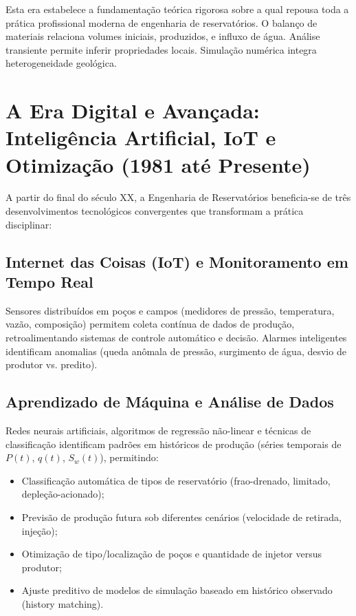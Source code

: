 \documentclass[12pt,a4paper,oneside,brazilian,sumario=tradicional]{abntex2}
\begin{document}
Esta era estabelece a fundamentação teórica rigorosa sobre a qual repousa toda a prática profissional moderna de engenharia de reservatórios. O balanço de materiais relaciona volumes iniciais, produzidos, e influxo de água. Análise transiente permite inferir propriedades locais. Simulação numérica integra heterogeneidade geológica.

\section{A Era Digital e Avançada: Inteligência Artificial, IoT e Otimização (1981 até Presente)}

A partir do final do século XX, a Engenharia de Reservatórios beneficia-se de três desenvolvimentos tecnológicos convergentes que transformam a prática disciplinar:

\subsection*{Internet das Coisas (IoT) e Monitoramento em Tempo Real}

Sensores distribuídos em poços e campos (medidores de pressão, temperatura, vazão, composição) permitem coleta contínua de dados de produção, retroalimentando sistemas de controle automático e decisão. Alarmes inteligentes identificam anomalias (queda anômala de pressão, surgimento de água, desvio de produtor vs. predito).

\subsection*{Aprendizado de Máquina e Análise de Dados}

Redes neurais artificiais, algoritmos de regressão não-linear e técnicas de classificação identificam padrões em históricos de produção (séries temporais de $P(t)$, $q(t)$, $S_w(t)$), permitindo:
\begin{itemize}
  \item Classificação automática de tipos de reservatório (frao-drenado, limitado, depleção-acionado);
  \item Previsão de produção futura sob diferentes cenários (velocidade de retirada, injeção);
  \item Otimização de tipo/localização de poços e quantidade de injetor versus produtor;
  \item Ajuste preditivo de modelos de simulação baseado em histórico observado (history matching).
\end{itemize}
\end{document}
